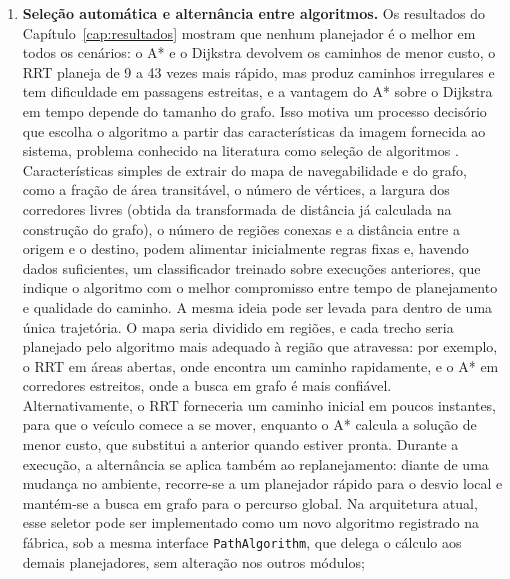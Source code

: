 \documentclass[
    12pt,
    openright,
    oneside,
    a4paper,
    english,
    brazil
]{abntex2}
\begin{document}
\begin{enumerate}
    \item \textbf{Seleção automática e alternância entre algoritmos.} Os resultados do Capítulo~\ref{cap:resultados} mostram que nenhum planejador é o melhor em todos os cenários: o A* e o Dijkstra devolvem os caminhos de menor custo, o RRT planeja de 9 a 43 vezes mais rápido, mas produz caminhos irregulares e tem dificuldade em passagens estreitas, e a vantagem do A* sobre o Dijkstra em tempo depende do tamanho do grafo. Isso motiva um processo decisório que escolha o algoritmo a partir das características da imagem fornecida ao sistema, problema conhecido na literatura como seleção de algoritmos \cite{rice1976, kerschke2019}. Características simples de extrair do mapa de navegabilidade e do grafo, como a fração de área transitável, o número de vértices, a largura dos corredores livres (obtida da transformada de distância já calculada na construção do grafo), o número de regiões conexas e a distância entre a origem e o destino, podem alimentar inicialmente regras fixas e, havendo dados suficientes, um classificador treinado sobre execuções anteriores, que indique o algoritmo com o melhor compromisso entre tempo de planejamento e qualidade do caminho. A mesma ideia pode ser levada para dentro de uma única trajetória. O mapa seria dividido em regiões, e cada trecho seria planejado pelo algoritmo mais adequado à região que atravessa: por exemplo, o RRT em áreas abertas, onde encontra um caminho rapidamente, e o A* em corredores estreitos, onde a busca em grafo é mais confiável. Alternativamente, o RRT forneceria um caminho inicial em poucos instantes, para que o veículo comece a se mover, enquanto o A* calcula a solução de menor custo, que substitui a anterior quando estiver pronta. Durante a execução, a alternância se aplica também ao replanejamento: diante de uma mudança no ambiente, recorre-se a um planejador rápido para o desvio local e mantém-se a busca em grafo para o percurso global. Na arquitetura atual, esse seletor pode ser implementado como um novo algoritmo registrado na fábrica, sob a mesma interface \texttt{PathAlgorithm}, que delega o cálculo aos demais planejadores, sem alteração nos outros módulos;

\end{enumerate}
\end{document}

